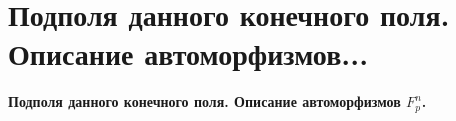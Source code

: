 \section{
  Подполя данного конечного поля. Описание автоморфизмов... %
}

\textbf{Подполя данного конечного поля. Описание автоморфизмов $F_p^n$.}
